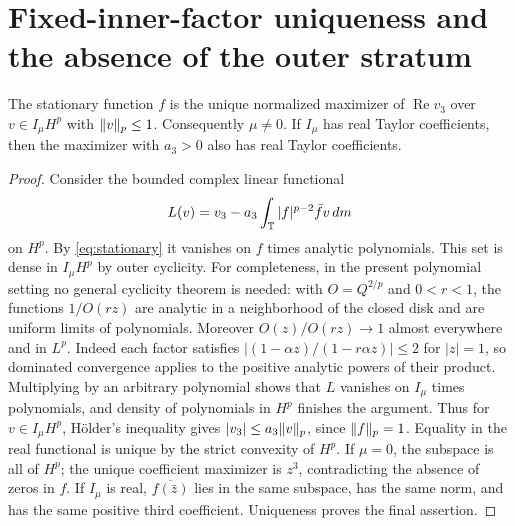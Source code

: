 \section{Fixed-inner-factor uniqueness and the absence of the outer stratum}
\begin{lemma}
The stationary function $f$ is the unique normalized maximizer of
$\operatorname{Re}v_3$ over $v\in I_\mu H^p$ with $\lVert v\rVert_p\leq1$.
Consequently $\mu\ne0$. If $I_\mu$ has real Taylor coefficients, then the
maximizer with $a_3>0$ also has real Taylor coefficients.
\end{lemma}
\begin{proof}
Consider the bounded complex linear functional
\[
 L(v)=v_3-a_3\int_{\mathbb T}|f|^{p-2}\bar f v\,dm
\]
on $H^p$. By \eqref{eq:stationary} it vanishes on $f$ times analytic
polynomials. This set is dense in $I_\mu H^p$ by outer cyclicity.
For completeness, in the present polynomial setting no general cyclicity
theorem is needed: with $O=Q^{2/p}$ and $0<r<1$, the functions $1/O(rz)$
are analytic in a neighborhood of the closed disk and are uniform limits of
polynomials. Moreover $O(z)/O(rz)\to1$ almost everywhere and in $L^p$.
Indeed each factor satisfies
$|(1-\alpha z)/(1-r\alpha z)|\leq2$ for $|z|=1$, so dominated convergence
applies to the positive analytic powers of their product. Multiplying by an
arbitrary polynomial shows that $L$ vanishes on $I_\mu$ times polynomials,
and density of polynomials in $H^p$ finishes the argument.
Thus for $v\in I_\mu H^p$, H\"older's inequality gives
$|v_3|\leq a_3\lVert v\rVert_p$, since $\lVert f\rVert_p=1$.
Equality in the real functional is unique by the strict convexity of $H^p$.
If $\mu=0$, the subspace is all of $H^p$; the unique coefficient maximizer
is $z^3$, contradicting the absence of zeros in $f$.
If $I_\mu$ is real, $\overline{f(\bar z)}$ lies in the same subspace, has the
same norm, and has the same positive third coefficient. Uniqueness proves
the final assertion.
\end{proof}

